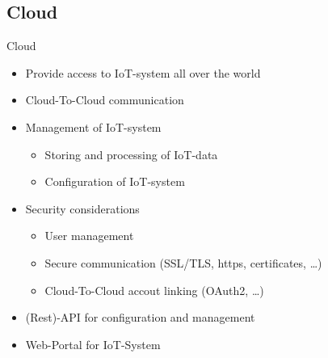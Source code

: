 ﻿\subsection{Cloud}

\begin{frame}{Cloud}
  \begin{description}[Cloud]
    \item[Cloud]
    \begin{itemize}
      \item Provide access to IoT-system all over the world
      \item Cloud-To-Cloud communication
      \item Management of IoT-system
      \begin{itemize}
        \item Storing and processing of IoT-data
        \item Configuration of IoT-system
      \end{itemize}
      \item Security considerations
      \begin{itemize}
        \item User management
        \item Secure communication (SSL/TLS, https, certificates, \ldots)
        \item Cloud-To-Cloud accout linking (OAuth2, \ldots)
      \end{itemize}
      \item (Rest)-API for configuration and management
      \item Web-Portal for IoT-System
    \end{itemize}
  \end{description}
\end{frame}
